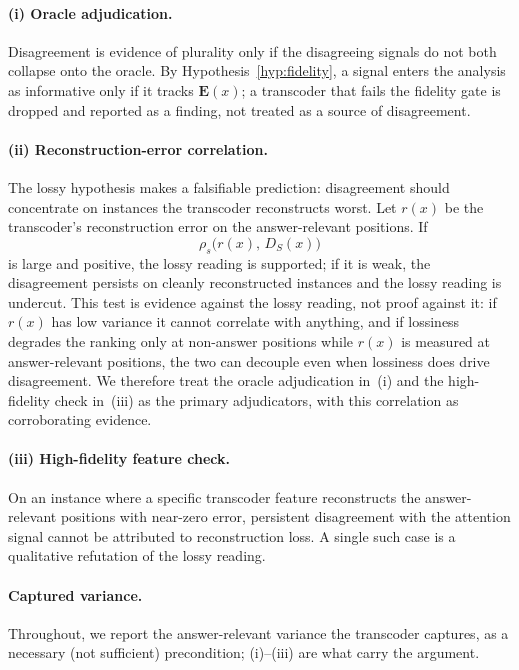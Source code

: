 \documentclass[11pt]{article}
\newcommand{\Spearman}{\rho_{s}}
\begin{document}
\paragraph{(i) Oracle adjudication.}
Disagreement is evidence of plurality only if the disagreeing signals do not
both collapse onto the oracle. By Hypothesis~\ref{hyp:fidelity}, a signal
enters the analysis as informative only if it tracks $\mathbf{E}(x)$; a
transcoder that fails the fidelity gate is dropped and reported as a finding,
not treated as a source of disagreement.

\paragraph{(ii) Reconstruction-error correlation.}
The lossy hypothesis makes a falsifiable prediction: disagreement should
concentrate on instances the transcoder reconstructs worst. Let
$r(x)$ be the transcoder's reconstruction error on the answer-relevant
positions. If
\[
  \Spearman\!\bigl( r(x),\, D_S(x) \bigr)
\]
is large and positive, the lossy reading is supported; if it is weak, the
disagreement persists on cleanly reconstructed instances and the lossy
reading is undercut. This test is evidence against the lossy reading, not
proof against it: if $r(x)$ has low variance it cannot correlate with
anything, and if lossiness degrades the ranking only at non-answer positions
while $r(x)$ is measured at answer-relevant positions, the two can decouple
even when lossiness does drive disagreement. We therefore treat the oracle
adjudication in~(i) and the high-fidelity check in~(iii) as the primary
adjudicators, with this correlation as corroborating evidence.

\paragraph{(iii) High-fidelity feature check.}
On an instance where a specific transcoder feature reconstructs the
answer-relevant positions with near-zero error, persistent disagreement with
the attention signal cannot be attributed to reconstruction loss. A single
such case is a qualitative refutation of the lossy reading.

\paragraph{Captured variance.}
Throughout, we report the answer-relevant variance the transcoder captures,
as a necessary (not sufficient) precondition; (i)--(iii) are what carry the
argument.
\end{document}
